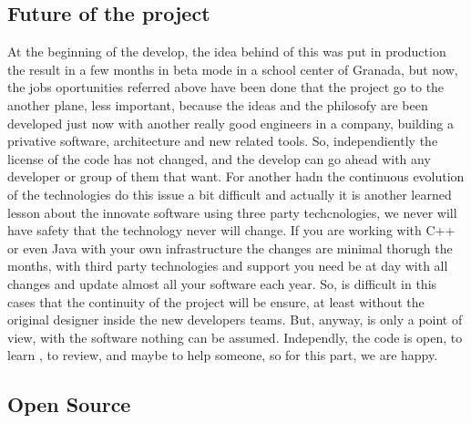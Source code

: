 \subsection{Future of the project}

At the beginning of the develop, the idea behind of this was put in production
the result in a few months in beta mode in a school center of Granada, but now,
the jobs oportunities referred above have been done that the project go to the
another plane, less important, because the ideas and the philosofy are been
developed just now with another really good engineers in a company, building a
privative software, architecture and new related tools.
\linebreak
\linebreak
\noindent So, independiently the license of the code has not changed, and the develop can
go ahead with any developer or group of them that want. For another hadn the
continuous evolution of the technologies do this issue a
bit difficult and actually it is another learned lesson about the innovate
software using three party techcnologies, we never will have safety that the
technology never will change. If you are working with C++ or even Java with your
own infrastructure the changes are minimal thorugh the months, with third party
technologies and support you need be at day with all changes and update almost
all your software each year. So, is difficult in this cases that the continuity
of the project will be ensure, at least without the original designer inside the
new developers teams. But, anyway, is only a point of view, with the software
nothing can be assumed.
\linebreak
\linebreak
\noindent Independly, the code is open, to learn , to review, and maybe to help someone,
so for this part, we are happy.

\subsection{Open Source}

